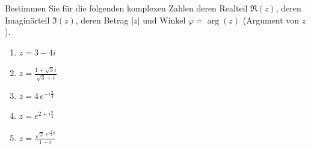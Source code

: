 \begin{ExerciseBlock}
Bestimmen Sie für die folgenden komplexen Zahlen deren Realteil $\Re(z)$, deren Imaginärteil $\Im(z)$, deren Betrag $|z|$ und Winkel $\varphi = \arg(z)$ (Argument von $z$).
\begin{enumerate}[label=\alph*)]
	\item $z = 3 - 4i$
	
	\item $z = \frac{1+\sqrt{3}i}{\sqrt{3}+i}$
	\item $z = 4 \, e^{-i \frac{\pi}{4}}$
	\item $z = e^{2 + i \frac{\pi}{4}}$
	\item $z = \frac{ \sqrt{2} \; e^{i \frac{3}{2} \pi}}{1-i}$
	
\end{enumerate}

\end{ExerciseBlock}
